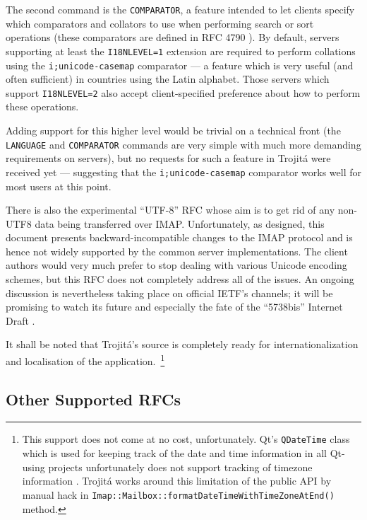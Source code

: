 \documentclass[trojita]{subfiles}
\begin{document}
The second command is the {\tt COMPARATOR}, a feature intended to let clients
specify which comparators and collators to use when performing search or sort operations (these comparators are defined
in RFC 4790 \cite{rfc4790}).  By default, servers supporting at least the {\tt I18NLEVEL=1} extension are required to
perform collations using the {\tt i;unicode-casemap} comparator \cite{rfc5051} --- a feature which is very useful (and
often sufficient) in countries using the Latin alphabet.  Those servers which support {\tt I18NLEVEL=2} also accept
client-specified preference about how to perform these operations.

\begin{trojitabehavior}
Adding support for this higher level would be trivial on a technical front (the {\tt LANGUAGE} and {\tt COMPARATOR}
commands are very simple with much more demanding requirements on servers), but no requests for such a feature in
Trojitá were received yet --- suggesting that the {\tt i;unicode-casemap} comparator works well for most users at this
point.
\end{trojitabehavior}

There is also the experimental ``UTF-8'' RFC \cite{rfc5738} whose aim is to get rid of any non-UTF8 data being
transferred over IMAP.  Unfortunately, as designed, this document presents backward-incompatible changes to the IMAP
protocol and is hence not widely supported by the common server implementations.  The client authors would very much
prefer to stop dealing with various Unicode encoding schemes, but this RFC does not completely address all of the
issues.  An ongoing discussion is nevertheless taking place on official IETF's channels; it will be promising to watch
its future and especially the fate of the ``5738bis'' Internet Draft \cite{draft-ietf-eai-5738bis}.

\begin{trojitabehavior}
It shall be noted that Trojitá's source is completely ready for internationalization and localisation of the
application.~\footnote{This support does not come at no cost, unfortunately.  Qt's {\tt QDateTime} class which is used
for keeping track of the date and time information in all Qt-using projects unfortunately does not support tracking of
timezone information \cite{qt-qdatetime-tz}.  Trojitá works around this limitation of the public API by manual hack in
{\tt Imap::Mailbox::formatDateTimeWithTimeZoneAtEnd()} method.}
\end{trojitabehavior}

\subsection{Other Supported RFCs}
\end{document}
